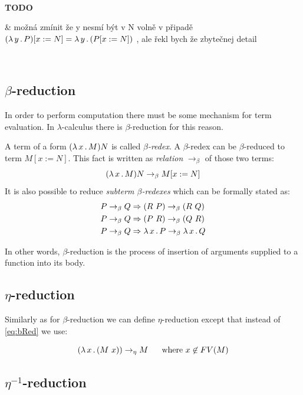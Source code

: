 \documentclass[12pt,a4paper]{report}
\newenvironment{todo}
{ ~\\[0.5em]
  \textbf{TODO}
  \begin{easylist}[itemize]}
{ \end{easylist}
  ~}
\begin{document}
\begin{todo}
& možná zmínit že y nesmí být v N volně v připadě\\
  $( \lambda \, y \, . \, P )[x:=N] = \lambda \, y \, . \, ( P[x:=N] )$ , 
  ale řekl bych že zbytečnej detail
\end{todo}


\subsection{$\beta$-reduction}

In order to perform computation there must be some
mechanism for term evaluation. In $\lambda$-calculus there
is $\beta$-reduction for this reason.\\

\newcommand{\bRedex}{$\beta$-redex\xspace}
\newcommand{\bRedexes}{$\beta$-redexes\xspace}
\newcommand{\bArrow}{\rightarrow_\beta\xspace}
\newcommand{\eArrow}{\rightarrow_\eta\xspace}
\newcommand{\eeArrow}{\rightarrow_{\eta^{-1}}\xspace}

A term of a form $( \lambda \, x \, . \, M )N$ is called \textit{\bRedex}.
A \bRedex can be $\beta$-reduced to term $M[x:=N]$. 
This fact is written as \textit{relation} $\bArrow$ 
of those two terms:
\begin{equation} \label{eq:bRed}
\lamb{x}{M}N \bArrow M[x:=N]
\end{equation}
It is also possible to reduce \textit{subterm \bRedexes} 
which can be formally stated as:
\begin{align*}
P \bArrow Q &\then (R~P)      \bArrow (R~Q) \\
P \bArrow Q &\then (P~R)      \bArrow (Q~R) \\
P \bArrow Q &\then \lam{x}{P} \bArrow \lam{x}{Q}  
\end{align*}

In other words, $\beta$-reduction is the process 
of insertion of arguments supplied to a function into 
its body. 

\subsection{$\eta$-reduction}

Similarly as for $\beta$-reduction we can define $\eta$-reduction 
except that instead of \ref{eq:bRed} we use:  

$$\lamb{x}{(M~x)} \eArrow M \text{ ~~~~where } x \not\in FV(M) $$

\subsection{$\eta^{-1}$-reduction}
\end{document}
